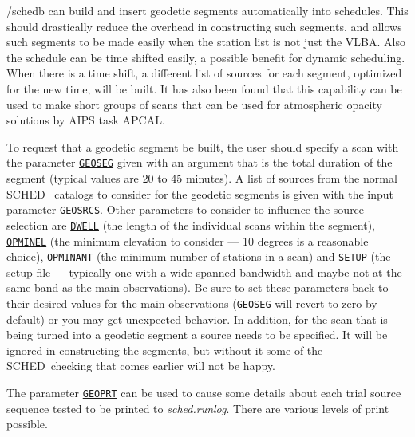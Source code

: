 \documentclass{report}
\newcommand{\schedb}{{\sc SCHED~}}
\begin{document}
/schedb can build and insert geodetic segments automatically into
schedules.  This should drastically reduce the overhead in
constructing such segments, and allows such segments to be made easily
when the station list is not just the VLBA.  Also the schedule can be
time shifted easily, a possible benefit for dynamic scheduling.  When
there is a time shift, a different list of sources for each segment,
optimized for the new time, will be built.  It has also been found that
this capability can be used to make short groups of scans that can
be used for atmospheric opacity solutions by AIPS task APCAL.

To request that a geodetic segment be built, the user should specify a
scan with the parameter 
{\hyperref[MP:GEOSEG]{{\tt GEOSEG}}} given with
an argument that is the total duration of the segment (typical values
are 20 to 45 minutes).  A list of sources from the normal \schedb
catalogs to consider for the geodetic segments is given with the
input parameter 
{\hyperref[MP:GEOSRCS]{{\tt GEOSRCS}}}.  Other parameters
to consider to influence the source selection are 
{\hyperref[MP:DWELL]{{\tt DWELL}}}
(the length of the individual scans within the segment), 
{\hyperref[MP:OPMINEL]{{\tt OPMINEL}}} (the minimum elevation
to consider --- 10 degrees is a reasonable choice), 
{\hyperref[MP:OPMINANT]{{\tt OPMINANT}}}
(the minimum number of stations in a scan) and
{\hyperref[MP:SETUP]{{\tt SETUP}}} (the setup file --- typically one with
a wide spanned bandwidth and maybe not at the same band as the main
observations).  Be sure to set these parameters back to their desired
values for the main observations ({\tt GEOSEG} will revert to zero by
default) or you may get unexpected behavior.  In addition, for the
scan that is being turned into a geodetic segment a source needs to be
specified.  It will be ignored in constructing the segments, but
without it some of the \schedb checking that comes earlier will not be
happy.

The parameter 
{\hyperref[MP:GEOPRT]{{\tt GEOPRT}}} can be used to cause
some details about each trial source sequence tested to be printed to
{\sl sched.runlog}.  There are various levels of print possible.
\end{document}
